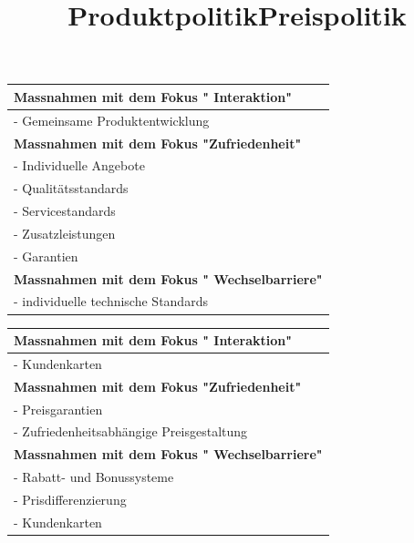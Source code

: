 \documentclass[../ZF_Wing.tex]{subfiles}
\begin{document}
\title{Produktpolitik}
\begin{table} [H]

\begin{tabular}{l}

\colorbox{pink!30}{\textbf{Massnahmen mit dem Fokus " Interaktion"} }

\\\hline
- Gemeinsame Produktentwicklung\\
\hline
\colorbox{pink!30}{\textbf{Massnahmen mit dem Fokus "Zufriedenheit"}}\\
\hline
- Individuelle Angebote\\
- Qualitätsstandards\\
- Servicestandards\\
- Zusatzleistungen\\
- Garantien\\
\hline
\colorbox{pink!30}{\textbf{Massnahmen mit dem Fokus " Wechselbarriere"}}\\
\hline
- individuelle technische Standards\\
\end{tabular}
\end{table}



\title{Preispolitik}
\begin{table} [H]

\begin{tabular}{l}

\colorbox{pink!30}{\textbf{Massnahmen mit dem Fokus " Interaktion"} }

\\\hline
- Kundenkarten\\
\hline
\colorbox{pink!30}{\textbf{Massnahmen mit dem Fokus "Zufriedenheit"}}\\
\hline
- Preisgarantien\\
- Zufriedenheitsabhängige Preisgestaltung\\
\hline
\colorbox{pink!30}{\textbf{Massnahmen mit dem Fokus " Wechselbarriere"}}\\
\hline
- Rabatt- und Bonussysteme\\
- Prisdifferenzierung\\
- Kundenkarten\\
\end{tabular}
\end{table}
\end{document}
